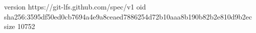 version https://git-lfs.github.com/spec/v1
oid sha256:3595df50ed0cb7694a4e9a8ceaed7886254d72b10aaa8b190b82b2e810d9b2ec
size 10752

